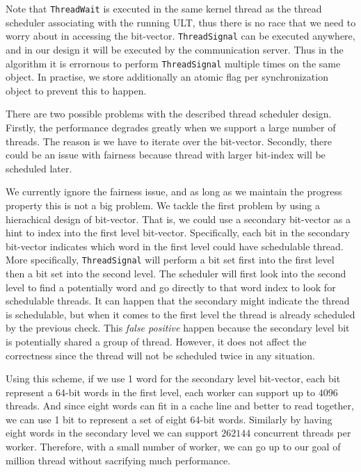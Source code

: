 \documentclass{sig-alternate-05-2015}
\begin{document}
Note that \texttt{ThreadWait} is executed in the same kernel thread as the
thread scheduler associating with the running ULT, thus there is no race that
we need to worry about in accessing the bit-vector. \texttt{ThreadSignal} can
be executed anywhere, and in our design it will be executed by the
communication server. Thus in the algorithm it is errornous to perform
\texttt{ThreadSignal} multiple times on the same object. In practise, we store
additionally an atomic flag per synchronization object to prevent this to
happen.

There are two possible problems with the described thread scheduler design.
Firstly, the performance degrades greatly when we support a large number of
threads. The reason is we have to iterate over the bit-vector. Secondly, there
could be an issue with fairness because thread with larger bit-index will be
scheduled later.

We currently ignore the fairness issue, and as long as we maintain the progress
property this is not a big problem. We tackle the first problem by using a
hierachical design of bit-vector.  That is, we could use a secondary bit-vector
as a hint to index into the first level bit-vector.  Specifically, each bit in
the secondary bit-vector indicates which word in the first level could have
schedulable thread. More specifically, \texttt{ThreadSignal} will perform a bit
set first into the first level then a bit set into the second level. The
scheduler will first look into the second level to find a potentially word and
go directly to that word index to look for schedulable threads. It can happen
that the secondary might indicate the thread is schedulable, but when it comes
to the first level the thread is already scheduled by the previous check.  This
\textit{false positive} happen because the secondary level bit is potentially
shared a group of thread. However, it does not affect the correctness since the
thread will not be scheduled twice in any situation.

Using this scheme, if we use 1 word for the secondary level bit-vector, each
bit represent a 64-bit words in the first level, each worker can support up to
$4096$ threads. And since eight words can fit in a cache line and better to read
together, we can use 1 bit to represent a set of eight 64-bit words. Similarly by having
eight words in the secondary level we can support $262144$ concurrent threads per
worker. Therefore, with a small number of worker, we can go up to our goal of
million thread without sacrifying much performance.
\end{document}
